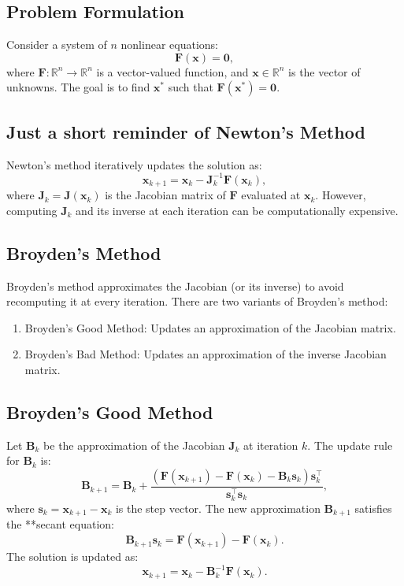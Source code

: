 \documentclass[%
oneside,                 %
final,                   %
10pt]{article}
\begin{document}
\subsection*{Problem Formulation}

Consider a system of \( n \) nonlinear equations:
\[
\mathbf{F}(\mathbf{x}) = \mathbf{0},
\]
where \( \mathbf{F}: \mathbb{R}^n \to \mathbb{R}^n \) is a vector-valued function, and \( \mathbf{x} \in \mathbb{R}^n \) is the vector of unknowns. The goal is to find \( \mathbf{x}^* \) such that \( \mathbf{F}(\mathbf{x}^*) = \mathbf{0} \).

\subsection*{Just a short reminder of Newton’s Method}

Newton’s method iteratively updates the solution as:
\[
\mathbf{x}_{k+1} = \mathbf{x}_k - \mathbf{J}_k^{-1} \mathbf{F}(\mathbf{x}_k),
\]
where \( \mathbf{J}_k = \mathbf{J}(\mathbf{x}_k) \) is the Jacobian matrix of \( \mathbf{F} \) evaluated at \( \mathbf{x}_k \). However, computing \( \mathbf{J}_k \) and its inverse at each iteration can be computationally expensive.

\subsection*{Broyden’s Method}

Broyden’s method approximates the Jacobian (or its inverse) to avoid recomputing it at every iteration. There are two variants of Broyden’s method:
\begin{enumerate}
\item Broyden’s Good Method: Updates an approximation of the Jacobian matrix.

\item Broyden’s Bad Method: Updates an approximation of the inverse Jacobian matrix.
\end{enumerate}

\noindent
\subsection*{Broyden’s Good Method}

Let \( \mathbf{B}_k \) be the approximation of the Jacobian \( \mathbf{J}_k \) at iteration \( k \). The update rule for \( \mathbf{B}_k \) is:
\[
\mathbf{B}_{k+1} = \mathbf{B}_k + \frac{(\mathbf{F}(\mathbf{x}_{k+1}) - \mathbf{F}(\mathbf{x}_k) - \mathbf{B}_k \mathbf{s}_k) \mathbf{s}_k^\top}{\mathbf{s}_k^\top \mathbf{s}_k},
\]
where \( \mathbf{s}_k = \mathbf{x}_{k+1} - \mathbf{x}_k \) is the step vector. The new approximation \( \mathbf{B}_{k+1} \) satisfies the **secant equation:
\[
\mathbf{B}_{k+1} \mathbf{s}_k = \mathbf{F}(\mathbf{x}_{k+1}) - \mathbf{F}(\mathbf{x}_k).
\]
The solution is updated as:
\[
\mathbf{x}_{k+1} = \mathbf{x}_k - \mathbf{B}_k^{-1} \mathbf{F}(\mathbf{x}_k).
\]
\end{document}
